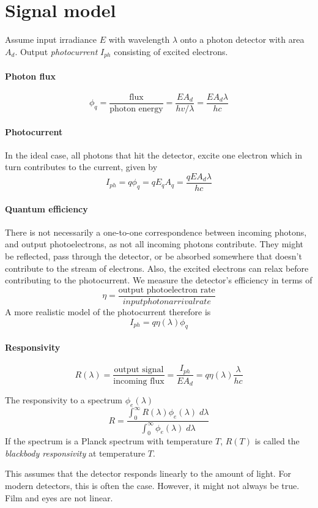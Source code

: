 \documentclass[article]{memoir}
\begin{document}
\section{Signal model}
Assume input irradiance \(E\) with wavelength \(\lambda\) onto a photon detector with area \(A_d\). Output \emph{photocurrent} \(I_{ph}\) consisting of excited electrons.

\paragraph{Photon flux}
\[
    \phi_q = \frac{\text{flux}}{\text{photon energy}} = \frac{EA_d}{hv/\lambda} = \frac{EA_d\lambda}{hc}
\]
\paragraph{Photocurrent}
In the ideal case, all photons that hit the detector, excite one electron which in turn contributes to the current, given by
\[
    I_{ph} = q \phi_q = q E_q A_q = \frac{q E A_d \lambda}{hc}
\]

\paragraph{Quantum efficiency}
There is not necessarily a one-to-one correspondence between incoming photons, and output photoelectrons, as not all incoming photons contribute. They might be reflected, pass through the detector, or be absorbed somewhere that doesn't contribute to the stream of electrons. Also, the excited electrons can relax before contributing to the photocurrent. We measure the detector's efficiency in terms of
\[
    \eta = \frac{\text{output photoelectron rate}}{input photon arrival rate}
\]
A more realistic model of the photocurrent therefore is
\[
    I_{ph} = q \eta(\lambda) \phi_q
\]
\paragraph{Responsivity}
\[
    R(\lambda) = \frac{\text{output signal}}{\text{incoming flux}} = \frac{I_{ph}}{EA_d} = q \eta(\lambda) \frac{\lambda}{hc}
\]

The responsivity to a spectrum \(\phi_e(\lambda)\)
\[
    R = \frac{\int_0^\infty R(\lambda)\phi_{e}(\lambda)\; d\lambda}{\int_0^\infty \phi_e(\lambda)\; d\lambda}
\]
If the spectrum is a Planck spectrum with temperature \(T\), \(R(T)\) is called the \emph{blackbody responsivity} at temperature \(T\).

This assumes that the detector responds linearly to the amount of light. For modern detectors, this is often the case. However, it might not always be true. Film and eyes are not linear.
\end{document}

